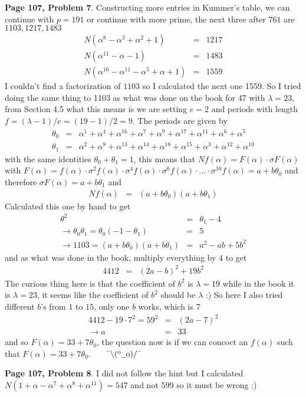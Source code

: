 \documentclass[aps,preprint,preprintnumbers,nofootinbib,showpacs,prd]{revtex4-1}
\newcommand{\nbea}{\begin{eqnarray*}}
\newcommand{\neea}{\end{eqnarray*}}
\newcommand{\dunno}{$ {}^{\mbox {--}}\backslash(^{\rm o}{}\underline{\hspace{0.2cm}}{\rm o})/^{\mbox {--}}$}
\begin{document}
{\bf Page 107, Problem 7}. Constructing more entries in Kummer's table, we can continue with $p = 191$ or continue with more prime, the next three after $761$ are $1103, 1217, 1483$
%
\nbea
N(\alpha^8 - \alpha^3 + \alpha^2 + 1) & = & 1217 \\
N(\alpha^{11} - \alpha - 1) & = & 1483 \\
N(\alpha^{16} - \alpha^{11} - \alpha^5 + \alpha + 1) & = & 1559
\neea
%
I couldn't find a factorization of $1103$ so I calculated the next one 1559. So I tried doing the same thing to 1103 as what was done on the book for 47 with $\lambda = 23$, from Section 4.5 what this means is we are setting $e=2$ and periods with length $f = (\lambda - 1)/e = (19 - 1)/2 = 9$. The periods are given by
%
\nbea
\theta_0 & = & \alpha^{1} + \alpha^{4} + \alpha^{16} + \alpha^{7} + \alpha^{9} + \alpha^{17} + \alpha^{11} + \alpha^{6} + \alpha^{5} \\
\theta_1 & = & \alpha^{2} + \alpha^{8} + \alpha^{13} + \alpha^{14} + \alpha^{18} + \alpha^{15} + \alpha^{3} + \alpha^{12} + \alpha^{10}
\neea
%
with the same identities $\theta_0 + \theta_1 = 1$, this means that $Nf(\alpha) = F(\alpha) \cdot\sigma F(\alpha)$ with $F(\alpha) = f(\alpha)\cdot \sigma^2 f(\alpha) \cdot \sigma^{4} f(\alpha) \cdot \sigma^{6} f(\alpha) \cdot \dots \cdot \sigma^{16} f(\alpha) = a + b \theta_0$ and therefore $\sigma F(\alpha) = a + b\theta_1$ and
%
\nbea
Nf(\alpha) & = & (a + b\theta_0)(a + b\theta_1)
\neea
%
Calculated this one by hand to get
%
\nbea
\theta^2 & = & \theta_1 - 4 \\
\to \theta_0\theta_1 = \theta_0(-1-\theta_1)& = & 5 \\
\to 1103 = (a + b\theta_0)(a + b\theta_1) & = & a^2 - ab + 5b^2
\neea
%
and as what was done in the book, multiply everything by 4 to get
%
\nbea
4412 & = & (2a - b)^2 + 19b^2
\neea
%
The curious thing here is that the coefficient of $b^2$ is $\lambda = 19$ while in the book it is $\lambda = 23$, it seems like the coefficient of $b^2$ should be $\lambda$ :) So here I also tried different $b$'s from $1$ to $15$, only one $b$ works, which is 7
%
\nbea
4412 - 19\cdot7^2 = 59^2 & = & (2a - 7)^2 \\
\to a & = & 33
\neea
%
and so $F(\alpha) = 33 + 7\theta_0$, the question now is if we can concoct an $f(\alpha)$ such that $F(\alpha) = 33 + 7\theta_0$. ~~~\dunno




{\bf Page 107, Problem 8}. I did not follow the hint but I calculated $N(1 + \alpha - \alpha^7 + \alpha^8 + \alpha^{11}) = 547$ and not 599 so it must be wrong :)
\end{document}
